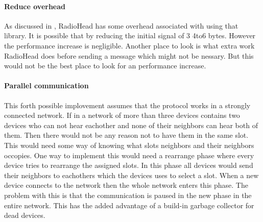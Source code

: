 \paragraph{Reduce overhead}
As discussed in , RadioHead has some overhead associated with using that library.
It is possible that by reducing the initial signal of 3 4to6 bytes. 
However the performance increase is negligible.
Another place to look is what extra work RadioHead does before sending a message which might not be nessary.
But this would not be the best place to look for an performance increase.

\paragraph{Parallel communication}
This forth possible implovement assumes that the protocol works in a strongly connected network. 
If in a network of more than three devices contains two devices who can not hear eachother and none of their neighbors can hear both of them. 
Then there would not be any reason not to have them in the same slot.
This would need some way of knowing what slots neighbors and their neighbors occopies.
One way to implement this would need a rearrange phase where every device tries to rearrange the assigned slots. 
In this phase all devices would send their neighbors to eachothers which the devices uses to select a slot.
When a new device connects to the network then the whole network enters this phase.
The problem with this is that the communication is paused in the new phase in the entire network.
This has the added advantage of a build-in garbage collector for dead devices.